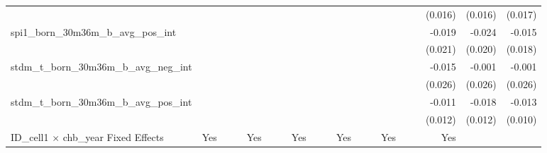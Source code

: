 \begin{tabular}{lrrrrrrrrrrrrrrrrrr}
                                            &              &              &              &              &              &              &              &              &               &              &              &               &              &              &               &      (0.016) &      (0.016) &       (0.017) \\ 
spi1\_born\_30m36m\_b\_avg\_pos\_int        &              &              &              &              &              &              &              &              &               &              &              &               &              &              &               &       -0.019 &       -0.024 &        -0.015 \\ 
                                            &              &              &              &              &              &              &              &              &               &              &              &               &              &              &               &      (0.021) &      (0.020) &       (0.018) \\ 
stdm\_t\_born\_30m36m\_b\_avg\_neg\_int     &              &              &              &              &              &              &              &              &               &              &              &               &              &              &               &       -0.015 &       -0.001 &        -0.001 \\ 
                                            &              &              &              &              &              &              &              &              &               &              &              &               &              &              &               &      (0.026) &      (0.026) &       (0.026) \\ 
stdm\_t\_born\_30m36m\_b\_avg\_pos\_int     &              &              &              &              &              &              &              &              &               &              &              &               &              &              &               &       -0.011 &       -0.018 &        -0.013 \\ 
                                            &              &              &              &              &              &              &              &              &               &              &              &               &              &              &               &      (0.012) &      (0.012) &       (0.010) \\ 
\midrule
ID\_cell1 $\times$ chb\_year Fixed Effects  &          Yes &              &              &          Yes &              &              &          Yes &              &               &          Yes &              &               &          Yes &              &               &          Yes &              &               \\ 

\end{tabular}
